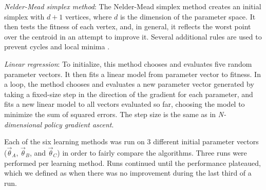 
\emph{Nelder-Mead simplex method}: The Nelder-Mead simplex
  method \citep{nm} creates an initial simplex with $d+1$ vertices,
  where $d$ is the dimension of the parameter space. It then tests the
  fitness of each vertex, and, in general, it reflects the worst point
  over the centroid in an attempt to improve it.  Several additional
  rules are used to prevent cycles and local minima \citep{nm}.

\emph{Linear regression}: To initialize, this method chooses and
  evaluates five random parameter vectors. It then fits a linear model
  from parameter vector to fitness. In a loop, the method chooses and
  evaluates a new parameter vector generated by taking a fixed-size
  step in the direction of the gradient for each parameter, and fits a
  new linear model to all vectors evaluated so far, choosing the model
  to minimize the sum of squared errors. The step size is the same as in
  \emph{N-dimensional policy gradient ascent}.


Each of the six learning methods was run on 3 different initial
parameter vectors ($\vec{\theta}_A$,
$\vec{\theta}_B$, and $\vec{\theta}_C$) in order to fairly compare the algorithms. Three runs were performed per learning method. Runs continued until the performance plateaued, which we defined as when there was no improvement during the last third of
a run.


